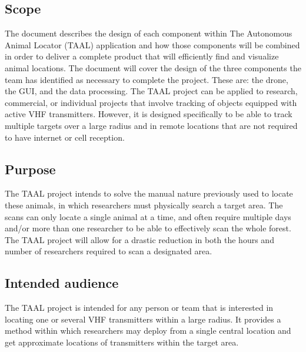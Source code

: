 \documentclass[onecolumn, draftclsnofoot,10pt, compsoc]{IEEEtran}
\begin{document}
\subsection{Scope}

The document describes the design of each component within The Autonomous Animal Locator (TAAL) application and how those components will be combined in order to deliver a complete product that will efficiently find and visualize animal locations.
The document will cover the design of the three components the team has identified as necessary to complete the project.
These are: the drone, the GUI, and the data processing.
\newline
\newline
The TAAL project can be applied to research, commercial, or individual projects that involve tracking of objects equipped with active VHF transmitters.
However, it is designed specifically to be able to track multiple targets over a large radius and in remote locations that are not required to have internet or cell reception.

\subsection{Purpose}

The TAAL project intends to solve the manual nature previously used to locate these animals, in which researchers must physically search a target area.
The scans can only locate a single animal at a time, and often require multiple days and/or more than one researcher to be able to effectively scan the whole forest.
The TAAL project will allow for a drastic reduction in both the hours and number of researchers required to scan a designated area.

\subsection{Intended audience}

The TAAL project is intended for any person or team that is interested in locating one or several VHF transmitters within a large radius.
It provides a method within which researchers may deploy from a single central location and get approximate locations of transmitters within the target area.
\end{document}
